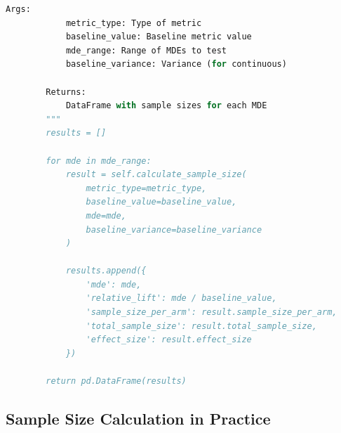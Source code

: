 \begin{lstlisting}[language=Python, caption={Comprehensive Power Analysis}]
        Args:
            metric_type: Type of metric
            baseline_value: Baseline metric value
            mde_range: Range of MDEs to test
            baseline_variance: Variance (for continuous)

        Returns:
            DataFrame with sample sizes for each MDE
        """
        results = []

        for mde in mde_range:
            result = self.calculate_sample_size(
                metric_type=metric_type,
                baseline_value=baseline_value,
                mde=mde,
                baseline_variance=baseline_variance
            )

            results.append({
                'mde': mde,
                'relative_lift': mde / baseline_value,
                'sample_size_per_arm': result.sample_size_per_arm,
                'total_sample_size': result.total_sample_size,
                'effect_size': result.effect_size
            })

        return pd.DataFrame(results)
\end{lstlisting}

\subsection{Sample Size Calculation in Practice}

